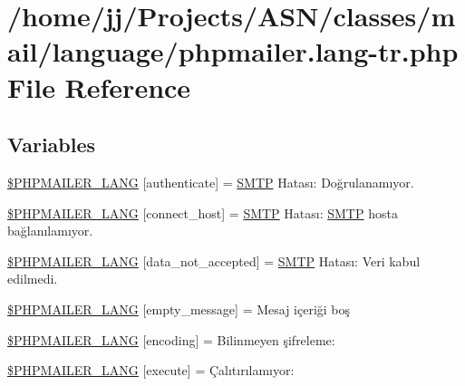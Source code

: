 \hypertarget{phpmailer_8lang-tr_8php}{}\section{/home/jj/\+Projects/\+A\+S\+N/classes/mail/language/phpmailer.lang-\/tr.php File Reference}
\label{phpmailer_8lang-tr_8php}
\subsection*{Variables}
\begin{DoxyCompactItemize}
\item 
\hyperlink{phpmailer_8lang-tr_8php_a2cb33073c989b85580748e331ed8b4aa}{\$\+P\+H\+P\+M\+A\+I\+L\+E\+R\+\_\+\+L\+A\+NG} \mbox{[}\textquotesingle{}authenticate\textquotesingle{}\mbox{]} = \textquotesingle{}\hyperlink{class_s_m_t_p}{S\+M\+TP} Hatası\+: Doğrulanamıyor.\textquotesingle{}
\item 
\hyperlink{phpmailer_8lang-tr_8php_a2ee0cc637a06b96e45600db31c6799ee}{\$\+P\+H\+P\+M\+A\+I\+L\+E\+R\+\_\+\+L\+A\+NG} \mbox{[}\textquotesingle{}connect\+\_\+host\textquotesingle{}\mbox{]} = \textquotesingle{}\hyperlink{class_s_m_t_p}{S\+M\+TP} Hatası\+: \hyperlink{class_s_m_t_p}{S\+M\+TP} hosta bağlanılamıyor.\textquotesingle{}
\item 
\hyperlink{phpmailer_8lang-tr_8php_a814c6b191205d2361b3233e9c9d6fda5}{\$\+P\+H\+P\+M\+A\+I\+L\+E\+R\+\_\+\+L\+A\+NG} \mbox{[}\textquotesingle{}data\+\_\+not\+\_\+accepted\textquotesingle{}\mbox{]} = \textquotesingle{}\hyperlink{class_s_m_t_p}{S\+M\+TP} Hatası\+: Veri kabul edilmedi.\textquotesingle{}
\item 
\hyperlink{phpmailer_8lang-tr_8php_a33772099f637c9d6c2cd7425e0e37fed}{\$\+P\+H\+P\+M\+A\+I\+L\+E\+R\+\_\+\+L\+A\+NG} \mbox{[}\textquotesingle{}empty\+\_\+message\textquotesingle{}\mbox{]} = \textquotesingle{}Mesaj içeriği boş\textquotesingle{}
\item 
\hyperlink{phpmailer_8lang-tr_8php_a817f7283f3d54c970a0c10305cc668cc}{\$\+P\+H\+P\+M\+A\+I\+L\+E\+R\+\_\+\+L\+A\+NG} \mbox{[}\textquotesingle{}encoding\textquotesingle{}\mbox{]} = \textquotesingle{}Bilinmeyen şifreleme\+: \textquotesingle{}
\item 
\hyperlink{phpmailer_8lang-tr_8php_a668217a9563a168f30f2a8548b6ed5a9}{\$\+P\+H\+P\+M\+A\+I\+L\+E\+R\+\_\+\+L\+A\+NG} \mbox{[}\textquotesingle{}execute\textquotesingle{}\mbox{]} = \textquotesingle{}Çalıtırılamıyor\+: \textquotesingle{}

\end{DoxyCompactItemize}
